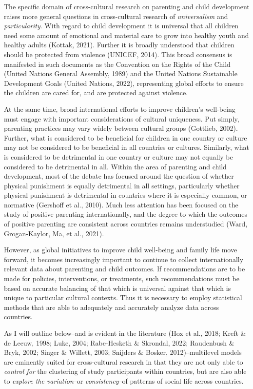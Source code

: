 \documentclass[
  letterpaper,
  DIV=11,
  numbers=noendperiod]{scrreprt}
\begin{document}
The specific domain of cross-cultural research on parenting and child
development raises more general questions in cross-cultural research of
\emph{universalism} and \emph{particularity}.  With
regard to child development it is universal that all children need some
amount of emotional and material care to grow into healthy youth and
healthy adults (Kottak, 2021). Further it is broadly understood that
children should be protected from violence (UNICEF, 2014). This broad
consensus is manifested in such documents as the Convention on the
Rights of the Child (United Nations General Assembly, 1989) and the
United Nations Sustainable Development Goals (United Nations, 2022),
representing global efforts to ensure the children are cared for, and
are protected against violence.

At the same time, broad international efforts to improve children's
well-being must engage with important considerations of cultural
uniqueness. Put simply, parenting practices may vary widely between
cultural groups (Gottlieb, 2002). Further, what is considered to be
beneficial for children in one country or culture may not be considered
to be beneficial in all countries or cultures. Similarly, what is
considered to be detrimental in one country or culture may not equally
be considered to be detrimental in all. Within the area of parenting and
child development, most of the debate has focused around the question of
whether physical punishment is equally detrimental in all settings,
particularly whether physical punishment is detrimental in countries
where it is especially common, or normative (Gershoff et al., 2010).
Much less attention has been focused on the study of positive parenting
internationally, and the degree to which the outcomes of positive
parenting are consistent across countries remains understudied (Ward,
Grogan-Kaylor, Ma, et al., 2021).

However, as global initiatives to improve child well-being and family
life move forward, it becomes increasingly important to continue to
collect internationally relevant data about parenting and child
outcomes. If recommendations are to be made for policies, interventions,
or treatments, such recommendations must be based on accurate balancing
of that which is universal against that which is unique to particular
cultural contexts. Thus it is necessary to employ statistical methods
that are able to adequately and accurately analyze data across
countries.

As I will outline below--and is evident in the literature (Hox et al.,
2018; Kreft \& de Leeuw, 1998; Luke, 2004; Rabe-Hesketh \& Skrondal,
2022; Raudenbush \& Bryk, 2002; Singer \& Willett, 2003; Snijders \&
Bosker, 2012)--multilevel models are eminently suited for cross-cultural
research in that they are not only able to \emph{control for} the
clustering of study participants within countries, but are also able to
\emph{explore the variation}--or \emph{consistency}--of patterns of
social life across countries.
\end{document}
